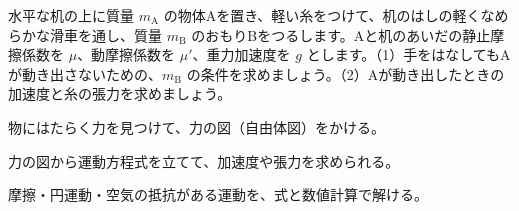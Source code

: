 \bkproblem 水平な机の上に質量 $m_{\mathrm A}$ の物体Aを置き、軽い糸をつけて、机のはしの軽くなめらかな滑車を通し、質量 $m_{\mathrm B}$ のおもりBをつるします。Aと机のあいだの静止摩擦係数を $\mu$、動摩擦係数を $\mu'$、重力加速度を $g$ とします。（1）手をはなしてもAが動き出さないための、$m_{\mathrm B}$ の条件を求めましょう。（2）Aが動き出したときの加速度と糸の張力を求めましょう。

\begin{furikaeri}
\begin{checklist}
\item 物にはたらく力を見つけて、力の図（自由体図）をかける。
\item 力の図から運動方程式を立てて、加速度や張力を求められる。
\item 摩擦・円運動・空気の抵抗がある運動を、式と数値計算で解ける。
\end{checklist}
\end{furikaeri}
